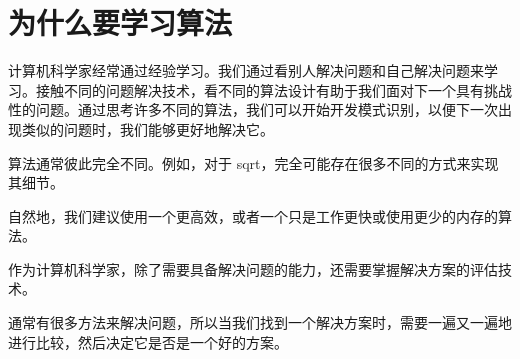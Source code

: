 \section{为什么要学习算法}
\begin{frame}\ft{\secname}
计算机科学家经常通过经验学习。我们通过看别人解决问题和自己解决问题来学习。接触不同的问题解决技术，看不同的算法设计有助于我们面对下一个具有挑战性的问题。通过思考许多不同的算法，我们可以开始开发模式识别，以便下一次出现类似的问题时，我们能够更好地解决它。
\end{frame}

\begin{frame}\ft{\secname}
  算法通常彼此完全不同。例如，对于 sqrt，完全可能存在很多不同的方式来实现其细节。

  自然地，我们建议使用一个更高效，或者一个只是工作更快或使用更少的内存的算法。

\end{frame}


\begin{frame}\ft{\secname}
  作为计算机科学家，除了需要具备解决问题的能力，还需要掌握解决方案的评估技术。

  
  通常有很多方法来解决问题，所以当我们找到一个解决方案时，需要一遍又一遍地进行比较，然后决定它是否是一个好的方案。

\end{frame}
